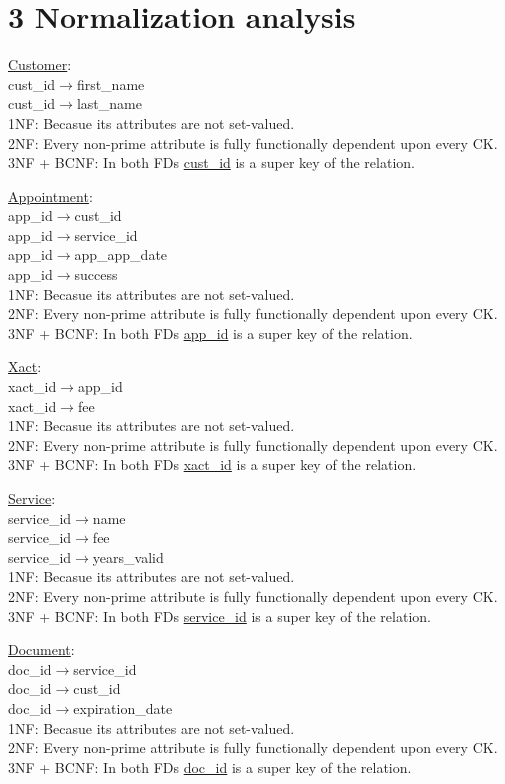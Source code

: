 \documentclass[12pt]{article}
\newcommand{\ul}{\underline}
\begin{document}
\newpage
\section*{3 Normalization analysis}
\ul{Customer}:\\
cust\_id$\rightarrow$first\_name\\
cust\_id$\rightarrow$last\_name\\
1NF: Becasue its attributes are not set-valued.\\
2NF: Every non-prime attribute is fully functionally dependent upon every CK.\\
3NF + BCNF: In both FDs \ul{cust\_id} is a super key of the relation.

\ul{Appointment}:\\
app\_id$\rightarrow$cust\_id\\
app\_id$\rightarrow$service\_id\\
app\_id$\rightarrow$app\_app\_date\\
app\_id$\rightarrow$success\\
1NF: Becasue its attributes are not set-valued.\\
2NF: Every non-prime attribute is fully functionally dependent upon every CK.\\
3NF + BCNF: In both FDs \ul{app\_id} is a super key of the relation.

\ul{Xact}:\\
xact\_id$\rightarrow$app\_id\\
xact\_id$\rightarrow$fee\\
1NF: Becasue its attributes are not set-valued.\\
2NF: Every non-prime attribute is fully functionally dependent upon every CK.\\
3NF + BCNF: In both FDs \ul{xact\_id} is a super key of the relation.

\ul{Service}:\\
service\_id$\rightarrow$name\\
service\_id$\rightarrow$fee\\
service\_id$\rightarrow$years\_valid\\
1NF: Becasue its attributes are not set-valued.\\
2NF: Every non-prime attribute is fully functionally dependent upon every CK.\\
3NF + BCNF: In both FDs \ul{service\_id} is a super key of the relation.

\ul{Document}:\\
doc\_id$\rightarrow$service\_id\\
doc\_id$\rightarrow$cust\_id\\
doc\_id$\rightarrow$expiration\_date\\
1NF: Becasue its attributes are not set-valued.\\
2NF: Every non-prime attribute is fully functionally dependent upon every CK.\\
3NF + BCNF: In both FDs \ul{doc\_id} is a super key of the relation.
\end{document}
